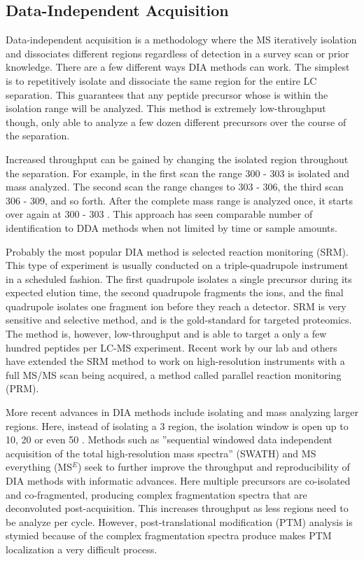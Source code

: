 \subsection*{Data-Independent Acquisition}
Data-independent acquisition is a methodology where the MS iteratively isolation and dissociates different \mz{} regions regardless of detection in a survey scan or prior knowledge. There are a few different ways DIA methods can work. The simplest is to repetitively isolate and dissociate the same \mz{} region for the entire LC separation. This guarantees that any peptide precursor whose \mz{} is within the isolation range will be analyzed. This method is extremely low-throughput though, only able to analyze a few dozen different precursors over the course of the separation.

Increased throughput can be gained by changing the isolated \mz{} region throughout the separation. For example, in the first scan the \mz{} range 300 - 303 is isolated and mass analyzed. The second scan the range changes to 303 - 306, the third scan 306 - 309, and so forth. After the complete mass range is analyzed once, it starts over again at 300 - 303 \mz{}. This approach has seen comparable number of identification to DDA methods when not limited by time or sample amounts.\cite{panda} 

Probably the most popular DIA method is selected reaction monitoring (SRM).\cite{mrm1,mrm2,mrm3} This type of experiment is usually conducted on a triple-quadrupole instrument in a scheduled fashion. The first quadrupole isolates a single precursor during its expected elution time, the second quadrupole fragments the ions, and the final quadrupole isolates one fragment ion before they reach a detector. SRM is very sensitive and selective method, and is the gold-standard for targeted proteomics. The method is, however, low-throughput and is able to target a only a few hundred peptides per LC-MS experiment. Recent work by our lab and others have extended the SRM method to work on high-resolution instruments with a full MS/MS scan being acquired, a method called parallel reaction monitoring (PRM).\cite{prm1,prm2} 

More recent advances in DIA methods include isolating and mass analyzing larger \mz{} regions. Here, instead of isolating a 3 \mz{} region, the isolation window is open up to 10, 20 or even 50 \mz{}. Methods such as ''sequential windowed data independent acquisition of the total high-resolution mass spectra'' (SWATH) and MS everything (MS$^E$) seek to further improve the throughput and reproducibility of DIA methods with informatic advances.\cite{swath,mse} Here multiple precursors are co-isolated and co-fragmented, producing complex fragmentation spectra that are deconvoluted post-acquisition. This increases throughput as less \mz{} regions need to be analyze per cycle. However, post-translational modification (PTM) analysis is stymied because of the complex fragmentation spectra produce makes PTM localization a very difficult process.

